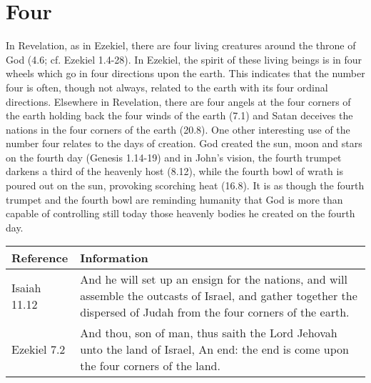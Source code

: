 \section*{Four}
In Revelation, as in Ezekiel, there are four living creatures around the throne of God (4.6; cf. Ezekiel 1.4-28). In Ezekiel, the spirit of these living beings is in four wheels which go in four directions upon the earth. This indicates that the number four is often, though not always, related to the earth with its four ordinal directions.
Elsewhere in Revelation, there are four angels at the four corners of the earth holding back the four winds of the earth (7.1) and Satan deceives the nations in the four corners of the earth (20.8). 
\newline\newline
One other interesting use of the number four relates to the days of creation. God created the sun, moon and stars on the fourth day (Genesis 1.14-19) and in John's vision, the fourth trumpet darkens a third of the heavenly host (8.12), while the fourth bowl of wrath is poured out on the sun, provoking scorching heat (16.8). It is as though the fourth trumpet and the fourth bowl are reminding humanity that God is more than capable of controlling still today those heavenly bodies he created on the fourth day.
\newline\newline
\begin{tabularx}{\textwidth}{l X}
\toprule
\textbf{Reference} & \textbf{Information}\\
\midrule
Isaiah 11.12 & And he will set up an ensign for the nations, and will assemble the outcasts of Israel, and gather together the dispersed of Judah from the four corners of the earth. \\
\addlinespace
Ezekiel 7.2 & And thou, son of man, thus saith the Lord Jehovah unto the land of Israel, An end: the end is come upon the four corners of the land. \\
\bottomrule
\end{tabularx}

